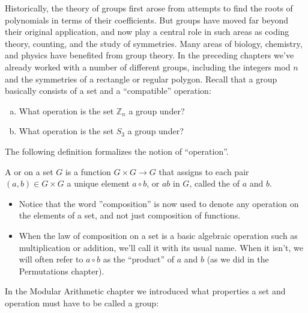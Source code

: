 Historically, the theory of groups first arose from attempts to find the roots of polynomials in terms of their coefficients.  But groups have moved far beyond their original application, and now play a central role in such areas as coding theory, counting, and the study of  symmetries. Many areas of biology, chemistry, and physics have benefited from group theory. In the preceding chapters we've already worked with a number of different groups, including the integers mod $n$ and the symmetries of a rectangle or regular polygon. Recall that a group basically consists of a set and a ``compatible'' operation:

\begin{exercise}{}
\begin{enumerate}[(a)]
\item
What operation is the set ${\mathbb Z}_n$ a group under?
\item
What operation is the set $S_3$ a group under?
\end{enumerate}
\end{exercise}
The following definition formalizes the notion of ``operation''.

\begin{defn} \label{group_op}
 A  or  on a set $G$ is a function $G \times G \rightarrow G$ that assigns to each pair $(a,b) \in G \times G$ a unique element $a \circ b$, or $ab$ in $G$, called the  of $a$ and $b$.
\end{defn}

\begin{rem}
\begin{itemize}
\item
Notice that the word ''composition'' is now used to denote any operation on the elements of a set, and not just composition of functions.
\item
When the law of composition on a set is a basic algebraic operation such as multiplication or addition, we'll call it with its usual name.  When it isn't, we will often refer to $a \circ b$  as the ``product'' of $a$ and $b$  (as we did in the Permutations chapter).
\end{itemize}
\end{rem}

In the Modular Arithmetic chapter we introduced what properties a set and operation must have to be called a group:

